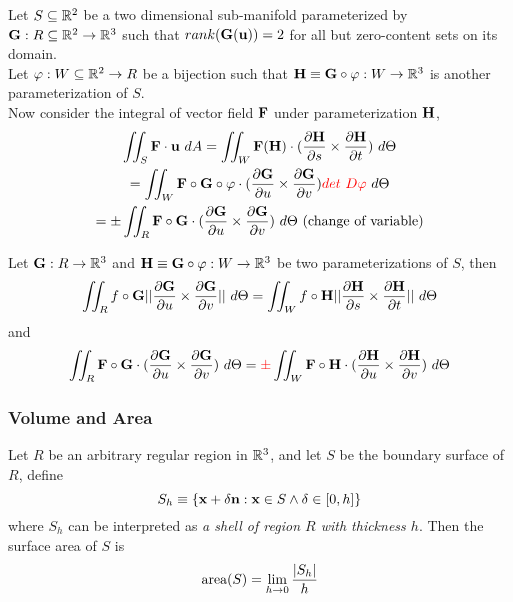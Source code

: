 \documentclass[11pt]{article}
\begin{document}
				\begin{remark}
					Let $S \subseteq \mathbb{R}^2$ be a two dimensional sub-manifold parameterized by $\textbf{G}: R \subseteq \mathbb{R}^2 \to \mathbb{R}^3$ such that $rank(\textbf{G}(\textbf{u})) = 2$ for all but zero-content sets on its domain. \\
					Let $\varphi: W\subseteq \mathbb{R}^2 \to R$ be a bijection such that $\textbf{H} \equiv \textbf{G} \circ \varphi: W \to \mathbb{R}^3$ is another parameterization of $S$. \\
					Now consider the integral of vector field $\textbf{F}$ under parameterization $\textbf{H}$,
					\begin{gather}
						\iint_S \textbf{F} \cdot \textbf{u}\ dA = \iint_W \textbf{F}(\textbf{H}) \cdot (\frac{\partial{\textbf{H}}}{\partial{s}} \times \frac{\partial{\textbf{H}}}{\partial{t}})\ d\Theta \\
						= \iint_W \textbf{F}\circ\textbf{G}\circ\varphi \cdot (\frac{\partial{\textbf{G}}}{\partial{u}} \times \frac{\partial{\textbf{G}}}{\partial{v}}) \textcolor{red}{det\ D\varphi}\ d\Theta \\
						= \pm \iint_R \textbf{F}\circ \textbf{G} \cdot (\frac{\partial{\textbf{G}}}{\partial{u}} \times \frac{\partial{\textbf{G}}}{\partial{v}})\ d\Theta \text{{ (change of variable)}}
					\end{gather}
				\end{remark}
				
				\begin{theorem}[Invariance]
					Let $\textbf{G}: R \to \mathbb{R}^3$ and $\textbf{H} \equiv \textbf{G}\circ\varphi: W \to \mathbb{R}^3$ be two parameterizations of $S$, then
					\begin{equation}
						\iint_R f\circ \textbf{G} \vert \vert {\frac{\partial{\textbf{G}}}{\partial{u}} \times \frac{\partial{\textbf{G}}}{\partial{v}}} \vert \vert\ d\Theta = \iint_W f\circ \textbf{H} \vert \vert {\frac{\partial{\textbf{H}}}{\partial{s}} \times \frac{\partial{\textbf{H}}}{\partial{t}}} \vert \vert\ d\Theta
					\end{equation}
					and 
					\begin{equation}
						\iint_R \textbf{F}\circ \textbf{G} \cdot (\frac{\partial{\textbf{G}}}{\partial{u}} \times \frac{\partial{\textbf{G}}}{\partial{v}})\ d\Theta 
						= \textcolor{red}{\pm}\iint_W \textbf{F}\circ \textbf{H} \cdot (\frac{\partial{\textbf{H}}}{\partial{u}} \times \frac{\partial{\textbf{H}}}{\partial{v}})\ d\Theta
					\end{equation}
				\end{theorem}
				
			\subsubsection{Volume and Area}
				\begin{theorem}
					Let $R$ be an arbitrary regular region in $\mathbb{R}^3$, and let $S$ be the boundary surface of $R$, define
					\begin{equation}
						S_h \equiv \{
							\textbf{x} + \delta \textbf{n}: \textbf{x} \in S \land \delta \in [0, h]
						\}
					\end{equation}
					where $S_h$ can be interpreted as \emph{a shell of region $R$ with thickness $h$}. Then the surface area of $S$ is 
					\begin{equation}
						\text{{area}}(S) = \lim_{h \to 0} \frac{|S_h|}{h}
					\end{equation}
				\end{theorem}
\end{document}
